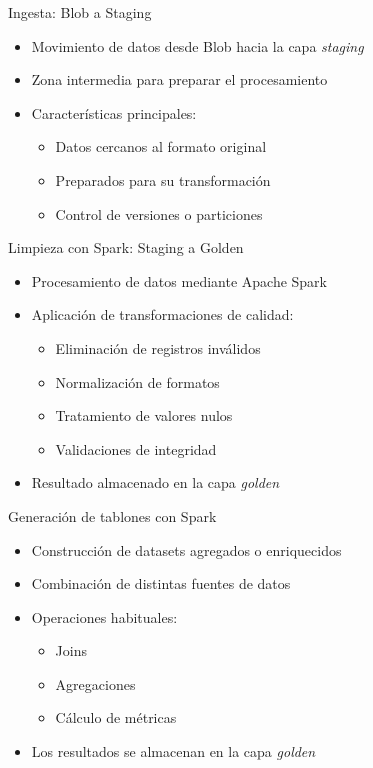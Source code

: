 \documentclass{beamer}
\begin{document}
\begin{frame}{Ingesta: Blob a Staging}
\begin{itemize}
    \item Movimiento de datos desde Blob hacia la capa \textit{staging}
    \item Zona intermedia para preparar el procesamiento
    \item Características principales:
    \begin{itemize}
        \item Datos cercanos al formato original
        \item Preparados para su transformación
        \item Control de versiones o particiones
    \end{itemize}
\end{itemize}
\end{frame}

\begin{frame}{Limpieza con Spark: Staging a Golden}
\begin{itemize}
    \item Procesamiento de datos mediante Apache Spark
    \item Aplicación de transformaciones de calidad:
    \begin{itemize}
        \item Eliminación de registros inválidos
        \item Normalización de formatos
        \item Tratamiento de valores nulos
        \item Validaciones de integridad
    \end{itemize}
    \item Resultado almacenado en la capa \textit{golden}
\end{itemize}
\end{frame}

\begin{frame}{Generación de tablones con Spark}
\begin{itemize}
    \item Construcción de datasets agregados o enriquecidos
    \item Combinación de distintas fuentes de datos
    \item Operaciones habituales:
    \begin{itemize}
        \item Joins
        \item Agregaciones
        \item Cálculo de métricas
    \end{itemize}
    \item Los resultados se almacenan en la capa \textit{golden}
\end{itemize}
\end{frame}
\end{document}
